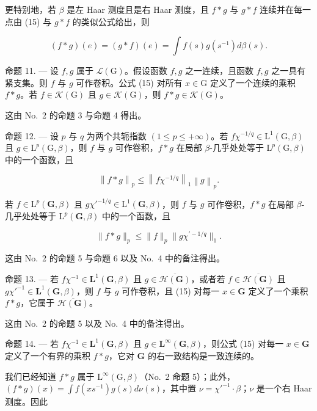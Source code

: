 更特别地，若 \(\beta\) 是左 Haar 测度且是右 Haar 测度，且 \(f*g\) 与 \(g*f\) 连续并在每一点由 (15) 与 \(g*f\) 的类似公式给出，则

\[
(f * g) (e) = (g * f) (e) = \int f (s) g (s ^ {- 1}) d \beta (s).\tag{17}
\]

命题 11. --- 设 \(f,g\) 属于 \(\mathcal{L}(\mathrm{G})\)。假设函数 \(f,g\) 之一连续，且函数 \(f,g\) 之一具有紧支集。则 \(f\) 与 \(g\) 可作卷积。公式 (15) 对所有 \(x\in\mathrm{G}\) 定义了一个连续的乘积 \(f*g\)。若 \(f\in\mathcal{K}(\mathrm{G})\) 且 \(g\in\mathcal{K}(\mathrm{G})\)，则 \(f*g\in\mathcal{K}(\mathrm{G})\)。

这由 No.~2 的命题 3 与命题 4 得出。

命题 12. --- 设 \(p\) 与 \(q\) 为两个共轭指数 \((1 \leqslant p \leqslant +\infty)\)。若 \(f\chi^{-1/q} \in \mathrm{L}^1(\mathrm{G}, \beta)\) 且 \(g \in \mathrm{L}^p(\mathrm{G}, \beta)\)，则 \(f\) 与 \(g\) 可作卷积，\(f * g\) 在局部 \(\beta\)-几乎处处等于 \(\mathrm{L}^p(\mathrm{G}, \beta)\) 中的一个函数，且

\[
\left\| f * g \right\| _ {p} \leqslant \left\| f \chi^ {- 1 / q} \right\| _ {1} \left\| g \right\| _ {p}.
\]

若 \(f \in \mathrm{L}^p(\mathbf{G},\beta)\) 且 \(g\chi'^{-1/q} \in \mathrm{L}^1(\mathbf{G},\beta)\)，则 \(f\) 与 \(g\) 可作卷积，\(f * g\) 在局部 \(\beta\)-几乎处处等于 \(\mathrm{L}^p(\mathbf{G},\beta)\) 中的一个函数，且

\[
\| f * g \| _ {p} \leqslant \| f \| _ {p} \| g \chi^ {\prime - 1 / q} \| _ {1}.
\]

这由 No.~2 的命题 5 与命题 6 以及 No.~4 中的备注得出。

命题 13. --- 若 \(f\chi^{-1} \in \mathbf{L}^1(\mathbf{G}, \beta)\) 且 \(g \in \overline{\mathcal{H}(\mathbf{G})}\)，或者若 \(f \in \overline{\mathcal{H}(\mathbf{G})}\) 且 \(g\chi'^{-1} \in \mathbf{L}^1(\mathbf{G}, \beta)\)，则 \(f\) 与 \(g\) 可作卷积，且 (15) 对每一 \(x \in \mathbf{G}\) 定义了一个乘积 \(f * g\)，它属于 \(\overline{\mathcal{H}(\mathbf{G})}\)。

这由 No.~2 的命题 5 以及 No.~4 中的备注得出。

命题 14. --- 若 \(f\chi^{-1} \in \mathbf{L}^1(\mathbf{G}, \beta)\) 且 \(g \in \mathbf{L}^\infty(\mathbf{G}, \beta)\)，则公式 (15) 对每一 \(x \in \mathbf{G}\) 定义了一个有界的乘积 \(f * g\)，它对 \(\mathbf{G}\) 的右一致结构是一致连续的。

我们已经知道 \(f * g\) 属于 \(\mathrm{L}^{\infty}(\mathrm{G},\beta)\)（No.~2 命题 5）；此外，\((f*g)(x) = \int f(xs^{-1})g(s)d\nu(s)\)，其中置 \(\nu = \chi'^{-1}\cdot \beta\)；\(\nu\) 是一个右 Haar 测度。因此

